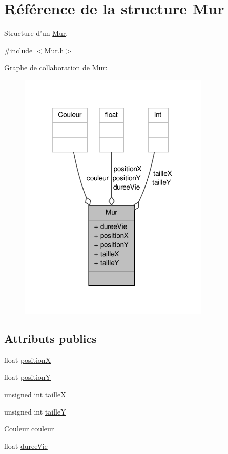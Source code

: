 \hypertarget{structMur}{\section{Référence de la structure Mur}
\label{structMur}
}


Structure d'un \hyperlink{structMur}{Mur}.  




{\ttfamily \#include $<$Mur.\-h$>$}



Graphe de collaboration de Mur\-:\nopagebreak
\begin{figure}[H]
\begin{center}
\leavevmode
\includegraphics[width=258pt]{structMur__coll__graph}
\end{center}
\end{figure}
\subsection*{Attributs publics}
\begin{DoxyCompactItemize}
\item 
float \hyperlink{structMur_affc832d25c091c05a2ab0340a38e8617}{position\-X}
\item 
float \hyperlink{structMur_a5cb3e3d2e2f71120f6746772a44a0980}{position\-Y}
\item 
unsigned int \hyperlink{structMur_a83d5a0639f49e58cfb805a91702d6701}{taille\-X}
\item 
unsigned int \hyperlink{structMur_ad0c6b841ae4069d6b4e6559d7e88cf47}{taille\-Y}
\item 
\hyperlink{Couleur_8h_aa304d0ca681f782b1d7735da33037dd7}{Couleur} \hyperlink{structMur_adfb47de65971e21c8b3012cfcf7cab28}{couleur}
\item 
float \hyperlink{structMur_a7b0f44b48d4a8408e1adeb057ad201f8}{duree\-Vie}
\end{DoxyCompactItemize}


